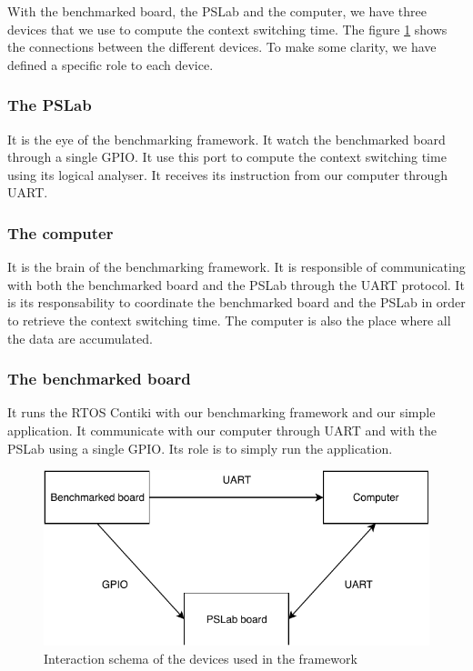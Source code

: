 With the benchmarked board, the PSLab and the computer, we have three devices that we use to compute the context switching time.
The figure \ref{fig:external-benchmarking-framework-schema} shows the connections between the different devices.
To make some clarity, we have defined a specific role to each device.

\subsubsection{The PSLab}
It is the eye of the benchmarking framework.
It watch the benchmarked board through a single GPIO.
It use this port to compute the context switching time using its logical analyser.
It receives its instruction from our computer through UART.

\subsubsection{The computer}
It is the brain of the benchmarking framework.
It is responsible of communicating with both the benchmarked board and the PSLab through the UART protocol.
It is its responsability to coordinate the benchmarked board and the PSLab in order to retrieve the context switching time.
The computer is also the place where all the data are accumulated.

\subsubsection{The benchmarked board}
It runs the RTOS Contiki with our benchmarking framework and our simple application.
It communicate with our computer through UART and with the PSLab using a single GPIO.
Its role is to simply run the application.

\begin{figure}[!ht]
  \centering
  \includegraphics[scale=1]{assets/external-benchmarking-framework-schema.pdf}
  \caption{\label{fig:external-benchmarking-framework-schema}Interaction schema of the devices used in the framework}
\end{figure}

